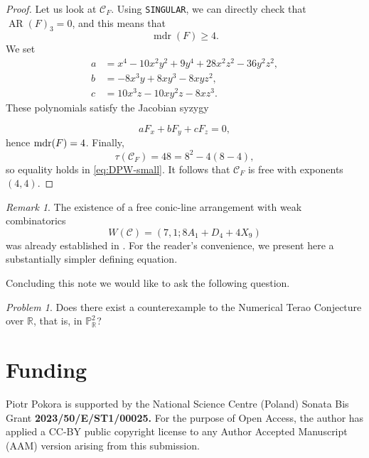 \documentclass[11pt]{article}
\theoremstyle{remark}
\newtheorem{remark}[theorem]{Remark}
\newtheorem{problem}[theorem]{Problem}
\newcommand{\mdr}{\operatorname{mdr}}
\newcommand{\AR}{\operatorname{AR}}
\begin{document}
\begin{proof}
Let us look at $\mathcal{C}_{F}$. Using \texttt{SINGULAR}, we can directly check that $\AR(F)_3=0$, and this means that
\[
 \mdr(F)\geq 4.
\]
We set 
\[
\begin{aligned}
a &= x^{4}-10x^{2}y^{2}+9y^{4}
     +28x^{2}z^{2}-36y^{2}z^{2},\\
b &= -8x^{3}y+8xy^{3}-8xyz^{2},\\
c &= 10x^{3}z-10xy^{2}z-8xz^{3}.
\end{aligned}
\]
These polynomials satisfy the Jacobian syzygy

\[
aF_x+bF_y+cF_z=0,
\]
hence ${\rm mdr}(F)=4$.
Finally,
\[
 \tau(\mathcal C_F)=48=8^2-4(8-4),
\]
so equality holds in \eqref{eq:DPW-small}.  It follows that $\mathcal C_F$
is free with exponents $(4,4)$.
\end{proof}
\begin{remark}
The existence of a free conic-line arrangement with weak combinatorics
\[
W(\mathcal{C})=(7,1;8A_1+D_4+4X_9)
\]
was already established in \cite[Theorem~1.3]{PokoraOneConic}. For the reader's convenience, we present here a substantially simpler defining equation.
\end{remark}
Concluding this note we would like to ask the following question.
\begin{problem}
Does there exist a counterexample to the Numerical Terao Conjecture over $\mathbb{R}$, that is, in $\mathbb{P}^{2}_{\mathbb{R}}$?
\end{problem}
\section*{Funding}
Piotr Pokora is supported by the National Science Centre (Poland) Sonata Bis Grant  \textbf{2023/50/E/ST1/00025.} For the purpose of Open Access, the author has applied a CC-BY public copyright license to any Author Accepted Manuscript (AAM) version arising from this submission.
\end{document}

